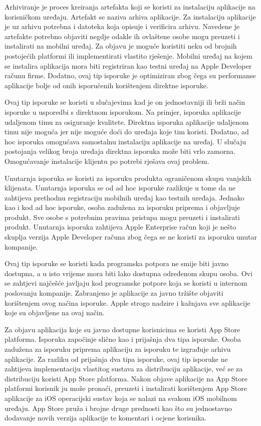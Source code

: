 \documentclass[times, utf8, diplomski, numeric]{fer}
\begin{document}
Arhiviranje je proces kreiranja artefakta koji se koristi za instalaciju aplikacije na korisničkom uređaju. Artefakt se naziva arhiva aplikacije. Za instalaciju aplikacije je uz arhivu potrebna i datoteka koja opisuje i verificira arhivu. Navedene je artefakte potrebno objaviti negdje odakle ih ovlaštene osobe mogu preuzeti i instalirati na mobilni uređaj. Za objavu je moguće koristiti neku od brojnih postojećih platformi ili implementirati vlastito rješenje. Mobilni uređaj na kojem se instalira aplikacija mora biti registriran kao testni uređaj na Apple Developer računu firme. Dodatno, ovaj tip isporuke je optimiziran zbog čega su performanse aplikacije bolje od onih isporučenih korištenjem direktne isporuke.

Ovaj tip isporuke se koristi u slučajevima kad je on jednostavniji ili brži način isporuke u usporedbi s direktnom isporukom. Na primjer, isporuka aplikacije udaljenom timu za osiguranje kvalitete. Direktna isporuka aplikacije udaljenom timu nije moguća jer nije moguće doći do uređaja koje tim koristi. Dodatno, ad hoc isporuka omogućava samostalnu instalaciju aplikacije na uređaj. U slučaju postojanja velikog broja uređaja direktna isporuka može biti vrlo zamorna. Omogućavanje instalacije klijentu po potrebi rješava ovaj problem.

Unutarnja isporuka se koristi za isporuku produkta ograničenom skupu vanjskih klijenata. Unutarnja isporuka se od ad hoc isporuke razlikuje u tome da ne zahtijeva prethodnu registraciju mobilnih uređaj kao testnih uređaja. Jednako kao i kod ad hoc isporuke, osoba zadužena za isporuku priprema i objavljuje produkt. Sve osobe s potrebnim pravima pristupa mogu preuzeti i instalirati produkt. Unutarnja isporuka zahtijeva Apple Enterprise račun koji je nešto skuplja verzija Apple Developer računa zbog čega se ne koristi za isporuku unutar kompanije.

Ovaj tip isporuke se koristi kada programska potpora ne smije biti javno dostupna, a u isto vrijeme mora biti lako dostupna određenom skupu osoba. Ovi se zahtjevi najčešće javljaju kod programske potpore koja se koristi u internom poslovanju kompanije. Zabranjeno je aplikacije za javno tržište objaviti korištenjem ovog načina isporuke. Apple strogo nadzire i kažnjava sve aplikacije koje su objavljene na ovaj način.

Za objavu aplikacija koje su javno dostupne korisnicima se koristi App Store platforma. Isporuka započinje slično kao i prijašnja dva tipa isporuke. Osoba zadužena za isporuku priprema aplikaciju za isporuku te izgrađuje arhivu aplikacije. Za razliku od prijašnja dva tipa isporuke, ovaj tip isporuke ne zahtijeva implementaciju vlastitog sustava za distribuciju aplikacije, već se za distribuciju koristi App Store platforma. Nakon objave aplikacije na App Store platformi korisnik ju može pronaći, preuzeti i instalirati korištenjem App Store aplikacije za iOS operacijski sustav koja se nalazi na svakom iOS mobilnom uređaju. App Store pruža i brojne druge prednosti kao što su jednostavno dodavanje novih verzija aplikacije te komentari i ocjene korisnika.
\end{document}

